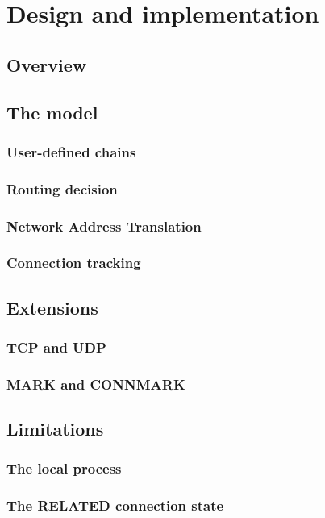 \chapter{Design and implementation}\label{chapter:design}

\section{Overview}

\section{The model}
\subsection{User-defined chains}
\subsection{Routing decision}
\subsection{Network Address Translation}
\subsection{Connection tracking}

\section{Extensions}
\subsection{TCP and UDP}
\subsection{MARK and CONNMARK}

\section{Limitations}
\subsection{The local process}
\subsection{The RELATED connection state}

